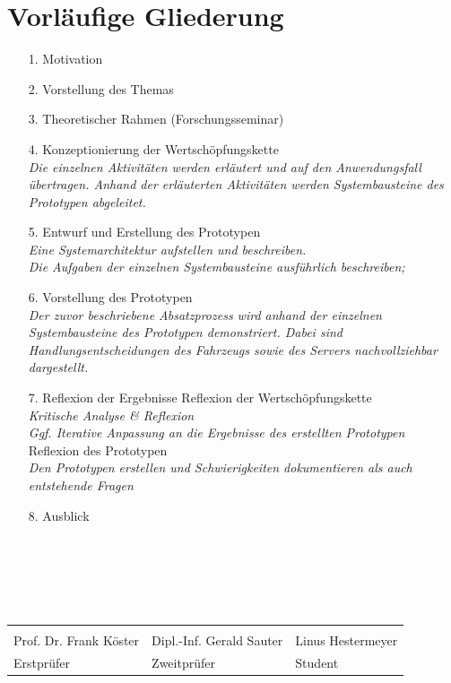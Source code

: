 \documentclass{article}
\begin{document}
\section{Vorläufige Gliederung}
\begin{itemize}
	\item[1.] Motivation
	\item[2.] Vorstellung des Themas
	\item[3.] Theoretischer Rahmen (Forschungsseminar)
	\item[4.] Konzeptionierung der Wertschöpfungskette\\
	\textit{Die einzelnen Aktivitäten werden erläutert und auf den Anwendungsfall übertragen. Anhand der erläuterten Aktivitäten werden Systembausteine des Prototypen abgeleitet.}
	\item[5.] Entwurf und Erstellung des Prototypen\\
	\textit{
	Eine Systemarchitektur aufstellen und beschreiben.\\
	Die Aufgaben der einzelnen Systembausteine ausführlich beschreiben;\\
	}
	\item[6.] Vorstellung des Prototypen\\
	\textit{Der zuvor beschriebene Absatzprozess wird anhand der einzelnen Systembausteine des Prototypen demonstriert. Dabei sind Handlungsentscheidungen des Fahrzeugs sowie des Servers nachvollziehbar dargestellt.}
	\item[7.] Reflexion der Ergebnisse
	 Reflexion der Wertschöpfungskette\\
	\textit{Kritische Analyse \& Reflexion}\\
	\textit{Ggf. Iterative Anpassung an die Ergebnisse des erstellten Prototypen}
	 Reflexion des Prototypen\\
	\textit{Den Prototypen erstellen und Schwierigkeiten dokumentieren als auch entstehende Fragen}
	\item[8.] Ausblick\\\\\\\\\\\\
\end{itemize}

\begin{center}
	\begin{tabularx}{\linewidth}{X X X}
		
	    \hrulefill&  \hrulefill & \hrulefill\\
		
		Prof. Dr. Frank Köster & Dipl.-Inf. Gerald Sauter & Linus Hestermeyer\\
		
		Erstprüfer & Zweitprüfer & Student\\
		
	\end{tabularx}
\end{center}
\end{document}
